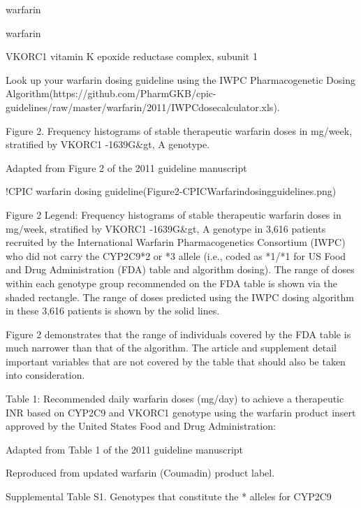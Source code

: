 \documentclass{resume} %
\begin{document}
\begin{rSection}{ warfarin }
\begin{rSection}{ warfarin }
\begin{rSubsection}{ VKORC1 }{ vitamin K epoxide reductase complex, subunit 1 }{}{}
 \newline
\item Look up your warfarin dosing guideline using the IWPC Pharmacogenetic Dosing Algorithm(https://github.com/PharmGKB/cpic-guidelines/raw/master/warfarin/2011/IWPCdosecalculator.xls).
 \newline
\item Figure 2. Frequency histograms of stable therapeutic warfarin doses in mg/week, stratified by VKORC1 -1639G&gt, A genotype.
 \newline
\item Adapted from Figure 2 of the 2011 guideline manuscript
 \newline
\item !CPIC warfarin dosing guideline(Figure2-CPICWarfarindosingguidelines.png)
 \newline
\item Figure 2 Legend: Frequency histograms of stable therapeutic warfarin doses in mg/week, stratified by VKORC1 -1639G&gt, A genotype in 3,616 patients recruited by the International Warfarin Pharmacogenetics Consortium (IWPC) who did not carry the CYP2C9*2 or *3 allele (i.e., coded as *1/*1 for US Food and Drug Administration (FDA) table and algorithm dosing). The range of doses within each genotype group recommended on the FDA table is shown via the shaded rectangle. The range of doses predicted using the IWPC dosing algorithm in these 3,616 patients is shown by the solid lines.
 \newline
\item Figure 2 demonstrates that the range of individuals covered by the FDA table is much narrower than that of the algorithm. The article and supplement detail important variables that are not covered by the table that should also be taken into consideration.
 \newline
\item Table 1: Recommended daily warfarin doses (mg/day) to achieve a therapeutic INR based on CYP2C9 and VKORC1 genotype using the warfarin product insert approved by the United States Food and Drug Administration:
 \newline
\item Adapted from Table 1 of the 2011 guideline manuscript
 \newline
\item Reproduced from updated warfarin (Coumadin) product label.
 \newline
\item Supplemental Table S1. Genotypes that constitute the * alleles for CYP2C9

\end{rSubsection}
\end{rSection}
\end{rSection}
\end{document}
